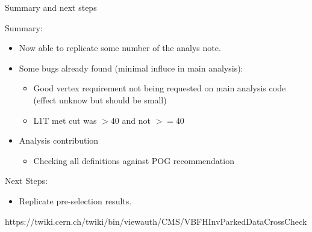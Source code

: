 \documentclass[8pt]{beamer}
\begin{document}
\begin{frame}{Summary and next steps}
 
\begin{block}{Summary:}
 
\begin{itemize}
  \item Now able to replicate some number of the analys note.
  \item Some bugs already found (minimal influce in main analysis):
  \begin{itemize}
    \item Good vertex requirement not being requested on main analysis code (effect unknow but should be small)
    \item L1T met cut was $>40$ and not $>=40$
  \end{itemize}
  \item Analysis contribution
  \begin{itemize}
    \item Checking all definitions against POG recommendation
  \end{itemize}
  \end{itemize}

\end{block}

\begin{block}{Next Steps:}
 
\begin{itemize}
  \item Replicate pre-selection results.
\end{itemize}
 
\end{block}

\begin{center}
https://twiki.cern.ch/twiki/bin/viewauth/CMS/VBFHInvParkedDataCrossCheck
\end{center}

\end{frame}
\end{document}
